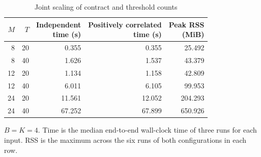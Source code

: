 \begin{table}[tb]
\centering
\caption{Joint scaling of contract and threshold counts}
\label{tab:joint-scale}
\small
\setlength{\tabcolsep}{3.5pt}
\renewcommand{\arraystretch}{1.1}
\begin{tabular*}{\columnwidth}{@{\extracolsep{\fill}}rrrrr@{}}
\toprule
$M$ & $T$ & \shortstack{Independent\\time (s)} &
\shortstack{Positively correlated\\time (s)} & \shortstack{Peak RSS\\(MiB)} \\
\midrule
8 & 20 & 0.355 & 0.355 & 25.492 \\
8 & 40 & 1.626 & 1.537 & 43.379 \\
12 & 20 & 1.134 & 1.158 & 42.809 \\
12 & 40 & 6.011 & 6.105 & 99.953 \\
24 & 20 & 11.561 & 12.052 & 204.293 \\
24 & 40 & 67.252 & 67.899 & 650.926 \\
\bottomrule
\end{tabular*}
\par\vspace{2pt}
\begin{minipage}{\columnwidth}
\footnotesize
$B=K=4$. Time is the median end-to-end wall-clock time of
three runs for each input.
RSS is the maximum across the six runs of both configurations
in each row.
\end{minipage}
\end{table}
